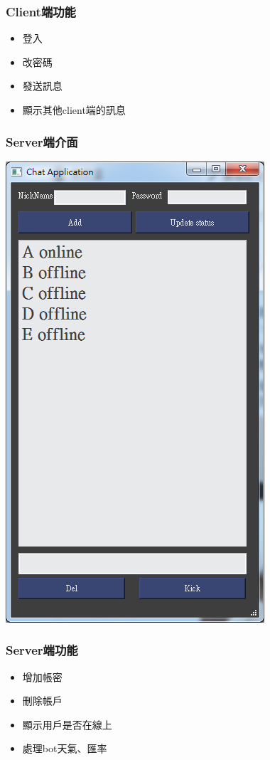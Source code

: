 \documentclass[utf8x]{beamer}
\begin{document}
\begin{frame}[t]
\frametitle{\huge Client端功能} %
\begin{itemize}
\Large \item 登入
\item 改密碼
\item 發送訊息
\item 顯示其他client端的訊息
\end{itemize}
\end{frame}

\begin{frame}
\frametitle{\huge Server端介面} %
\hspace{3.4cm} \includegraphics[scale=0.32]{serverui}
\end{frame}

\begin{frame}[t]
\frametitle{\huge Server端功能} %
\begin{itemize}
\Large \item 增加帳密
\item 刪除帳戶
\item 顯示用戶是否在線上
\item 處理bot天氣、匯率
\end{itemize}
\end{frame}
\end{document}
